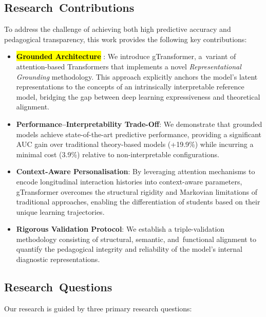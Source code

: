 \documentclass[applsci,article,accept,moreauthors,pdftex]{Definitions/mdpi}
\begin{document}
\subsection{Research~Contributions}
{To address the challenge of achieving both high predictive accuracy and pedagogical transparency, this work provides the following key contributions:}
\begin{itemize}
    \item \textbf{\hl{Grounded Architecture}%
}: {We introduce gTransformer, a~variant of attention-based Transformers that implements a novel \textit{Representational Grounding} methodology. This approach explicitly anchors the model's latent representations to the concepts of an intrinsically interpretable reference model, bridging the gap between deep learning expressiveness and theoretical alignment.}
    \item \textbf{Performance--Interpretability Trade-Off}: {We demonstrate that grounded models achieve state-of-the-art predictive performance, providing a significant AUC gain over traditional theory-based models (+19.9\%) while incurring a minimal cost (3.9\%) relative to non-interpretable configurations.}
    \item \textbf{Context-Aware Personalisation}: {By leveraging attention mechanisms to encode longitudinal interaction histories into context-aware parameters, gTransformer overcomes the structural rigidity and Markovian limitations of traditional approaches, enabling the differentiation of students based on their unique learning trajectories.}
    \item \textbf{Rigorous Validation Protocol}: {We establish a triple-validation methodology consisting of structural, semantic, and~functional alignment to quantify the pedagogical integrity and reliability of the model's internal diagnostic representations.}
\end{itemize}

\subsection{Research~Questions} \label{sec_rq}
Our research is guided by three primary research questions:
\end{document}
